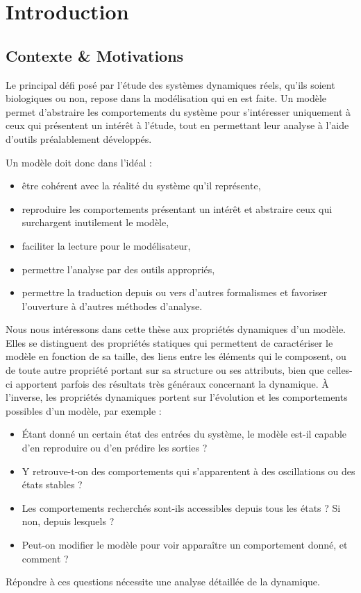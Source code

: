 
\chapter{Introduction}

\section{Contexte \& Motivations}

Le principal défi posé par l'étude des systèmes dynamiques réels,
qu'ils soient biologiques ou non,
repose dans la modélisation qui en est faite.
Un modèle permet d'abstraire les comportements du système
pour s'intéresser uniquement à ceux qui présentent un intérêt à l'étude,
tout en permettant leur analyse à l'aide d'outils préalablement développés.

Un modèle doit donc dans l'idéal :
\begin{itemize}
  \item être cohérent avec la réalité du système qu'il représente,
  \item reproduire les comportements présentant un intérêt
    et abstraire ceux qui surchargent inutilement le modèle,
  \item faciliter la lecture pour le modélisateur,
  \item permettre l'analyse par des outils appropriés,
  \item permettre la traduction depuis ou vers d'autres formalismes
    et favoriser l'ouverture à d'autres méthodes d'analyse.
\end{itemize}

Nous nous intéressons dans cette thèse aux propriétés dynamiques d'un modèle.
Elles se distinguent des propriétés statiques qui permettent de caractériser le modèle
en fonction de sa taille,
des liens entre les éléments qui le composent,
ou de toute autre propriété portant sur sa structure ou ses attributs,
bien que celles-ci apportent parfois des résultats très généraux concernant la dynamique.
À l'inverse, les propriétés dynamiques portent sur l'évolution et les comportements
possibles d'un modèle, par exemple :
\begin{itemize}
  \item Étant donné un certain état des entrées du système, le modèle est-il capable
    d'en reproduire ou d'en prédire les sorties ?
  \item Y retrouve-t-on des comportements qui s'apparentent à des oscillations
    ou des états stables ?
  \item Les comportements recherchés sont-ils accessibles depuis tous les états ?
    Si non, depuis lesquels ?
  \item Peut-on modifier le modèle pour voir apparaître un comportement donné, et comment ?
\end{itemize}
Répondre à ces questions nécessite une analyse détaillée de la dynamique.


